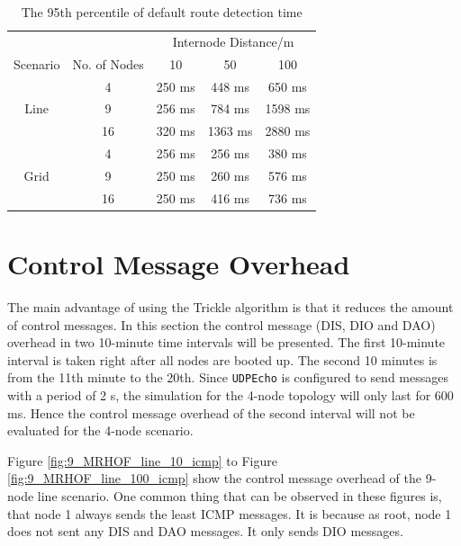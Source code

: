 \begin{table}
\caption{The 95th percentile of default route detection time}
\centering
    \begin{tabular}{ cc| c | c | c |} \cline{3-5}
     & & \multicolumn{3}{|c|}{Internode Distance/m }\\ \cline{1-5}
     \multicolumn{1}{|c|}{Scenario} & No. of Nodes  & 10      & 50      & 100     \\  \hline
     \multicolumn{1}{|c|}{\multirow{3}{*}{Line}} &
     \multicolumn{1}{|c|}{4}  & 250 ms  & 448 ms  & 650 ms  \\  \cline{2-5}
     \multicolumn{1}{|c|}{} & 9  & 256 ms  & 784 ms  & 1598 ms \\  \cline{2-5}
     \multicolumn{1}{|c|}{} & 16 & 320 ms  & 1363 ms & 2880 ms \\  \cline{1-5}
     \multicolumn{1}{|c|}{\multirow{4}{*}{Grid}} &
     \multicolumn{1}{|c|}{4}  & 256 ms  & 256 ms  & 380 ms  \\  \cline{2-5}
     \multicolumn{1}{|c|}{} & 9  & 250 ms  & 260 ms  & 576 ms  \\  \cline{2-5}
     \multicolumn{1}{|c|}{} & 16 & 250 ms  & 416 ms  & 736 ms  \\  \cline{1-5}  
    \end{tabular}
  \label{table:95}
\end{table}

\section{Control Message Overhead}
\label{ICMP}
The main advantage of using the Trickle algorithm is that it reduces the amount of control messages. In this section the control message (DIS, DIO and DAO) overhead in two 10-minute time intervals will be presented. The first 10-minute interval is taken right after all nodes are booted up. The second 10 minutes is from the 11th minute to the 20th. Since \texttt{UDPEcho} is configured to send messages with a period of 2 s, the simulation for the 4-node topology will only last for 600 ms. Hence the control message overhead of the second interval will not be evaluated for the 4-node scenario. 

Figure \ref{fig:9_MRHOF_line_10_icmp} to Figure \ref{fig:9_MRHOF_line_100_icmp} show the control message overhead  of the 9-node line scenario. One common thing that can be observed in these figures is, that node 1 always sends the least ICMP messages. It is because as root, node 1 does not sent any DIS and DAO messages. It only sends DIO messages.

